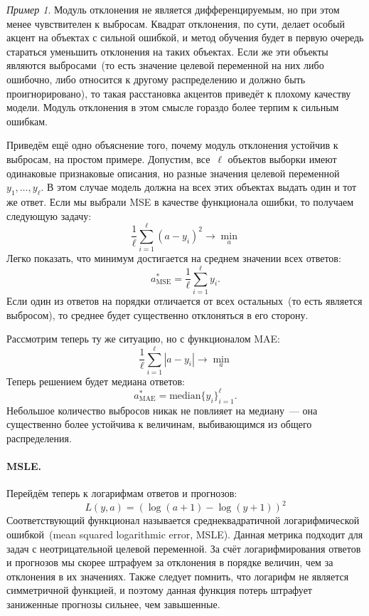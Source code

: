 \documentclass[a4paper, 12pt]{article}
\theoremstyle{plain} %
\theoremstyle{definition} %
\theoremstyle{remark} %
\newtheorem{example}{Пример}
\begin{document}
\begin{example}
Модуль отклонения не является дифференцируемым, но при этом менее чувствителен к выбросам.
Квадрат отклонения, по сути, делает особый акцент на объектах с сильной ошибкой,
и метод обучения будет в первую очередь стараться уменьшить отклонения на таких объектах.
Если же эти объекты являются выбросами~(то есть значение целевой переменной на них либо ошибочно,
либо относится к другому распределению и должно быть проигнорировано),
то такая расстановка акцентов приведёт к плохому качеству модели.
Модуль отклонения в этом смысле гораздо более терпим к сильным ошибкам.

Приведём ещё одно объяснение того, почему модуль отклонения устойчив к выбросам,
на простом примере.
Допустим, все~$\ell$ объектов выборки имеют одинаковые признаковые описания, но разные
значения целевой переменной~$y_1, \dots, y_\ell$.
В этом случае модель должна на всех этих объектах выдать один и тот же ответ.
Если мы выбрали MSE в качестве функционала ошибки, то получаем следующую задачу:
\[
    \frac{1}{\ell}
    \sum_{i = 1}^{\ell} \left(
        a - y_i
    \right)^2
    \to
    \min_a
\]
Легко показать, что минимум достигается на среднем значении всех ответов:
\[
    a_{\text{MSE}}^*
    =
    \frac{1}{\ell}
    \sum_{i = 1}^{\ell}
        y_i.
\]
Если один из ответов на порядки отличается от всех остальных~(то есть является выбросом),
то среднее будет существенно отклоняться в его сторону.

Рассмотрим теперь ту же ситуацию, но с функционалом MAE:
\[
    \frac{1}{\ell}
    \sum_{i = 1}^{\ell} \left|
        a - y_i
    \right|
    \to
    \min_a
\]
Теперь решением будет медиана ответов:
\[
    a_{\text{MAE}}^*
    =
    \text{median}
        \{y_i\}_{i = 1}^{\ell}.
\]
Небольшое количество выбросов никак не повлияет на медиану~--- она существенно
более устойчива к величинам, выбивающимся из общего распределения.

\paragraph{MSLE.}

Перейдём теперь к логарифмам ответов и прогнозов:
\[
    L(y, a) = (\log(a + 1) - \log(y + 1))^2
\]
Соответствующий функционал называется среднеквадратичной логарифмической ошибкой~(mean
squared logarithmic error, MSLE).
Данная метрика подходит для задач с неотрицательной целевой переменной.
За счёт логарифмирования ответов и прогнозов мы скорее штрафуем за отклонения
в порядке величин, чем за отклонения в их значениях.
Также следует помнить, что логарифм не является симметричной функцией,
и поэтому данная функция потерь штрафует заниженные прогнозы сильнее,
чем завышенные.


\end{example}
\end{document}
